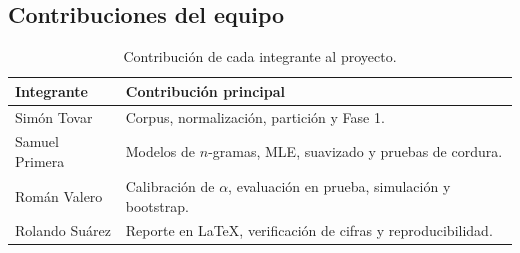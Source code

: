 \documentclass[11pt,letterpaper]{article}
\newcommand{\nombreA}{Simón Tovar}
\newcommand{\nombreB}{Samuel Primera}
\newcommand{\nombreC}{Román Valero}
\newcommand{\nombreD}{Rolando Suárez}
\begin{document}
\subsection*{Contribuciones del equipo}
\begin{table}[htbp]
\centering
\small
\caption{Contribución de cada integrante al proyecto.}
\label{tab:contribuciones}
\begin{tabularx}{\textwidth}{@{}lX@{}}
\toprule
\textbf{Integrante} & \textbf{Contribución principal}\\
\midrule
\nombreA & Corpus, normalización, partición y Fase 1.\\
\nombreB & Modelos de $n$-gramas, MLE, suavizado y pruebas de cordura.\\
\nombreC & Calibración de $\alpha$, evaluación en prueba, simulación y bootstrap.\\
\nombreD & Reporte en LaTeX, verificación de cifras y reproducibilidad.\\
\bottomrule
\end{tabularx}
\end{table}
\end{document}
